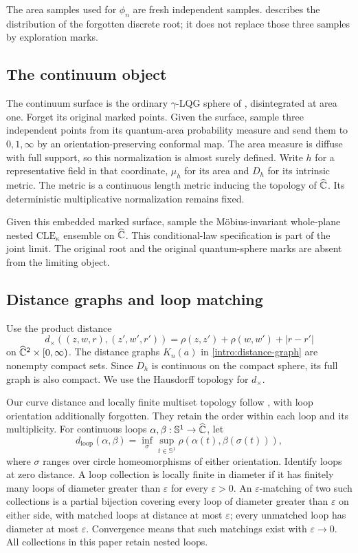 The area samples used for $\phi_n$ are fresh independent samples.
 describes the distribution of the forgotten
discrete root; it does not replace those three samples by exploration
marks.

\subsection{The continuum object}

The continuum surface is the ordinary $\gamma$-LQG sphere of
\citet[Definition~4.21(ii)]{DMSMating}, disintegrated at area one. Forget
its original marked points. Given the surface, sample three independent
points from its quantum-area probability measure and send them to
$0,1,\infty$ by an orientation-preserving conformal map. The area
measure is diffuse with full support, so this normalization is almost
surely defined. Write $h$ for a representative field in that
coordinate, $\mu_h$ for its area and $D_h$ for its intrinsic metric.
The metric is a continuous length metric inducing the topology of
$\widehat{\mathbb C}$. Its deterministic multiplicative normalization remains
fixed.

Given this embedded marked surface, sample the M\"obius-invariant
whole-plane nested $\mathrm{CLE}_{\kappa}$ ensemble on $\widehat{\mathbb C}$.
This conditional-law specification is part of the joint limit.
The original root and the original quantum-sphere marks are absent
from the limiting object.

\subsection{Distance graphs and loop matching}

Use the product distance
\[
 d_\times((z,w,r),(z',w',r'))
   =\rho(z,z')+\rho(w,w')+|r-r'|
\]
on $\widehat{\mathbb C}^2\times[0,\infty)$. The distance graphs
$K_n(a)$ in \eqref{intro:distance-graph} are nonempty compact sets.
Since $D_h$ is continuous on the compact sphere, its full graph is
also compact. We use the Hausdorff topology for $d_\times$.

\begin{definition}
\label{intro:loop-topology}
Our curve distance and locally finite multiset topology follow
\citet[Section~2.2]{GwynneMillerQianCLE}, with loop orientation additionally
forgotten. They retain the order within each loop and its multiplicity.
For continuous loops $\alpha,\beta:\mathbb S^1\to\widehat{\mathbb C}$, let
\[
 d_{\mathrm{loop}}(\alpha,\beta)
 =\inf_{\sigma}\sup_{t\in\mathbb S^1}
       \rho(\alpha(t),\beta(\sigma(t))),
\]
where $\sigma$ ranges over circle homeomorphisms of either orientation.
Identify loops at zero distance. A loop collection is locally finite
in diameter if it has finitely many loops of diameter greater than
$\varepsilon$ for every $\varepsilon>0$.
An $\varepsilon$-matching of two such collections is a partial
bijection covering every loop of diameter greater than $\varepsilon$
on either side, with matched loops at distance at most $\varepsilon$;
every unmatched loop has diameter at most $\varepsilon$.
Convergence means that such matchings exist with
$\varepsilon\to0$. All collections in this paper retain nested loops.
\end{definition}

